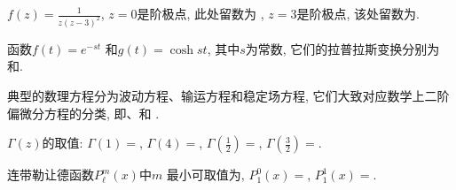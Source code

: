 \documentclass{njustexam}
\begin{document}
  \begin{problem}
  $f(z) = \frac{1}{z(z-3)^2}$, $z=0$是阶极点, 此处留数为 , $z=3$是阶极点, 该处留数为. 
  \end{problem}
  
  \begin{problem}
  函数$f(t) = e^{-st}$ 和$g(t)=\cosh{st}$, 其中$s$为常数, 
  它们的拉普拉斯变换分别为 和.
  \end{problem}
  
  \begin{problem}
  典型的数理方程分为波动方程、输运方程和稳定场方程, 
  它们大致对应数学上二阶偏微分方程的分类, 即、和 . 
  \end{problem}
  
  
  \begin{problem}
  $\Gamma(z)$的取值: $\Gamma(1)=$, 
  $\Gamma(4)=$, $\Gamma(\frac{1}{2})= $\fillout{$\sqrt{\pi}$},
  $\Gamma(\frac{3}{2}) = $.
  \end{problem}
  
 


\begin{problem}
连带勒让德函数$P_\ell^m(x)$中$m$%
最小可取值为\fillout{$-\ell$}, 
$P_1^0(x) = $,  $P_1^1(x) = $. 
\end{problem}



  
  
\end{document}
